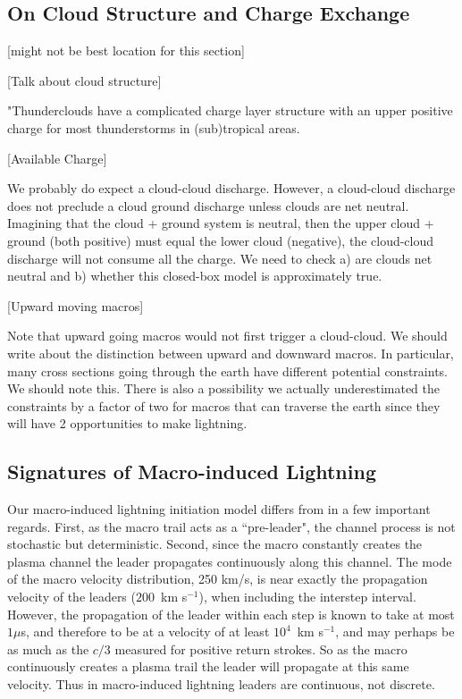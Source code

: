 \documentclass[%
 reprint,
 amsmath,amssymb,
 aps,
]{revtex4-2}
\begin{document}
    
    \subsection{On Cloud Structure and Charge Exchange}
    [might not be best location for this section]

        [Talk about cloud structure]

        "Thunderclouds have a complicated charge layer structure with an upper positive charge for most thunderstorms in (sub)tropical areas.

        [Available Charge]

        We probably do expect a cloud-cloud discharge. However, a cloud-cloud discharge does not preclude a cloud ground discharge unless clouds are net neutral. Imagining that the cloud + ground system is neutral, then the upper cloud + ground (both positive) must equal the lower cloud (negative), the cloud-cloud discharge will not consume all the charge. We need to check a) are clouds net neutral and b) whether this closed-box model is approximately true.

        [Upward moving macros]

        Note that upward going macros would not first trigger a cloud-cloud. We should write about the distinction between upward and downward macros. In particular, many cross sections going through the earth have different potential constraints. We should note this. There is also a possibility we actually underestimated the constraints by a factor of two for macros that can traverse the earth since they will have 2 opportunities to make lightning.


    \subsection{Signatures of Macro-induced Lightning} %
    \label{sec:signatures_of_macro_induced_lightning}

        Our macro-induced lightning initiation model differs from \citet{DwyerUman2014} in a few important regards. First, as the macro trail acts as a ``pre-leader", the channel process is not stochastic but deterministic. Second, since the macro constantly creates the plasma channel the leader propagates continuously along this channel. The mode of the macro velocity distribution, 250 km/s, is near exactly the propagation velocity of the leaders ($200\,$ km s$^{-1}$), when including the interstep interval. However, the propagation of the leader within each step is known to take at most $1\mu$s, and therefore to be at a velocity of at least $10^4\,$ km s$^{-1}$, and may perhaps be as much as the $c/3$ measured for positive return strokes. So as the macro continuously creates a plasma trail the leader will propagate at this same velocity. Thus in macro-induced lightning leaders are continuous, not discrete.
\end{document}
